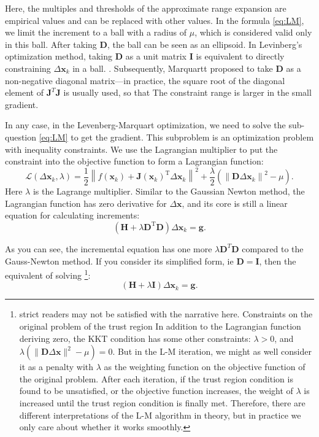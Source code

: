 Here, the multiples and thresholds of the approximate range expansion are empirical values ​​and can be replaced with other values. In the formula \eqref{eq:LM}, we limit the increment to a ball with a radius of $\mu$, which is considered valid only in this ball. After taking $\bm{D}$, the ball can be seen as an ellipsoid. In Levinberg's optimization method, taking $\bm{D}$ as a unit matrix $\bm{I}$ is equivalent to directly constraining $\Delta \bm{x}_k$ in a ball. . Subsequently, Marquartt proposed to take $\bm{D}$ as a non-negative diagonal matrix—in practice, the square root of the diagonal element of $\bm{J}^T \bm{J}$ is usually used, so that The constraint range is larger in the small gradient.

In any case, in the Levenberg-Marquart optimization, we need to solve the sub-question \eqref{eq:LM} to get the gradient. This subproblem is an optimization problem with inequality constraints. We use the Lagrangian multiplier to put the constraint into the objective function to form a Lagrangian function:
\begin{equation}
\mathcal{L}(\Delta \bm{x}_k, \lambda)= \frac{1}{2} {\left\| {f\left( \bm{x}_k \right) + \bm{J} \left( \bm{x}_k \right)^\mathrm{T} \Delta \bm{x}_k} \right\|^2} + \frac{\lambda}{2} \left( \left\| \bm{D} \Delta \bm{x}_k \right\|^2 - \mu \right).
\end{equation}
Here $\lambda$ is the Lagrange multiplier. Similar to the Gaussian Newton method, the Lagrangian function has zero derivative for $\Delta \bm{x}$, and its core is still a linear equation for calculating increments:
\begin{equation}
\left( \bm{H} +\lambda \bm{D}^\mathrm{T} \bm{D} \right) \Delta \bm{x}_k = \bm{g}.
\end{equation}

As you can see, the incremental equation has one more $\lambda \bm{D}^T \bm{D}$ compared to the Gauss-Newton method. If you consider its simplified form, ie $\bm{D}=\bm{I}$, then the equivalent of solving \footnote{strict readers may not be satisfied with the narrative here. Constraints on the original problem of the trust region In addition to the Lagrangian function deriving zero, the KKT condition has some other constraints: $\lambda>0$, and $\lambda(\|\bm{D} \Delta \bm{x}\|^2-\mu)=0$. But in the L-M iteration, we might as well consider it as a penalty with $\lambda$ as the weighting function on the objective function of the original problem. After each iteration, if the trust region condition is found to be unsatisfied, or the objective function increases, the weight of $\lambda$ is increased until the trust region condition is finally met. Therefore, there are different interpretations of the L-M algorithm in theory, but in practice we only care about whether it works smoothly. }:
\begin{displaymath}
\left( \bm{H} +\lambda \bm{I} \right) \Delta \bm{x}_k = \bm{g}.
\end{displaymath}

